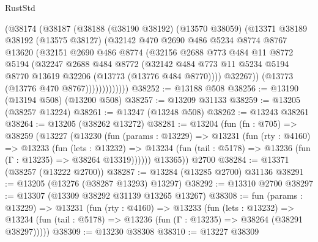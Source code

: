 \begin{lexlean}{RustStd}
\begin{coremodule}
                (@38174
                  (@38187
                    (@38188
                      (@38190 @38192)
                      (@13570 @38059)
                      (@13371
                        @38189
                        @38192
                        (@13575 @38127)
                        (@32142
                          @470
                          @2690
                          @486
                          @5234
                          @8774
                          @8767
                          @13620
                          (@32151
                            @2690
                            @486
                            @8774
                            (@32156
                              @2688
                              @773
                              @484
                              @11
                              @8772
                              @5194
                              (@32247
                                @2688
                                @484
                                @8772
                                (@32142
                                  @484
                                  @773
                                  @11
                                  @5234
                                  @5194
                                  @8770
                                  @13619
                                  @32206
                                  (@13773 (@13776 @484 @8770))))
                              @32267))
                          (@13773 (@13776 @470 @8767)))))))))))))
@38252 := @13188 @508
@38256 := @13190 (@13194 @508) (@13200 @508)
@38257 := @13209 @31133
@38259 := @13205 (@38257 @13224)
@38261 := @13247 (@13248 @508)
@38262 := @13243 @38261
@38264 := @13205 (@38262 @13272)
@38281 := @13204
    (fun (fn : @705) =>
    @38259
      (@13227
        (@13230
          (fun (params : @13229) =>
          @13231
            (fun (rty : @4160) =>
            @13233
              (fun (lets : @13232) =>
              @13234 (fun (tail : @5178) => @13236 (fun (Γ : @13235) => @38264 @13319))))))
        @13365))
    @2700
@38284 := @13371 (@38257 (@13222 @2700))
@38287 := @13284 (@13285 @2700) @31136
@38291 := @13205 (@13276 (@38287 @13293) @13297)
@38292 := @13310 @2700
@38297 := @13307 (@13309 @38292 @31139 @13265 @13267)
@38308 := fun (params : @13229) =>
  @13231
    (fun (rty : @4160) =>
    @13233
      (fun (lets : @13232) =>
      @13234 (fun (tail : @5178) => @13236 (fun (Γ : @13235) => @38264 (@38291 @38297)))))
@38309 := @13230 @38308
@38310 := @13227 @38309

\end{coremodule}
\end{lexlean}
